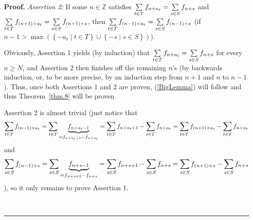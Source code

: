 \documentclass[numbers=enddot,12pt,final,onecolumn,notitlepage]{scrartcl}%
\numberwithin{exer}{section}
\theoremstyle{definition}
\newenvironment{proof}[1][Proof]{\noindent\textbf{#1.} }{\ \rule{0.5em}{0.5em}}
\let\sumnonlimits\sum
\renewcommand{\sum}{\sumnonlimits\limits}
\begin{document}
\begin{proof}
\textit{Assertion 2:} If some $n\in\mathbb{Z}$ satisfies $\sum\limits_{t\in
T}f_{n+a_{t}}=\sum\limits_{s\in S}f_{n+s}$ and $\sum\limits_{t\in T}f_{\left(
n+1\right)  +a_{t}}=\sum\limits_{s\in S}f_{\left(  n+1\right)  +s}$, then
$\sum\limits_{t\in T}f_{\left(  n-1\right)  +a_{t}}=\sum\limits_{s\in
S}f_{\left(  n-1\right)  +s}$ (if $n-1>\max\left(  \left\{  -a_{t}\mid t\in
T\right\}  \cup\left\{  -s\mid s\in S\right\}  \right)  $).

Obviously, Assertion 1 yields (by induction) that $\sum\limits_{t\in
T}f_{n+a_{t}}=\sum\limits_{s\in S}f_{n+s}$ for every $n\geq N$, and Assertion
2 then finishes off the remaining $n$'s (by backwards induction, or, to be
more precise, by an induction step from $n+1$ and $n$ to $n-1$). Thus, once
both Assertions 1 and 2 are proven, (\ref{BigLemma}) will follow and thus
Theorem~\ref{thm.8} will be proven.

Assertion 2 is almost trivial (just notice that%
\[
\sum\limits_{t\in T}f_{\left(  n-1\right)  +a_{t}}=\sum\limits_{t\in
T}\underbrace{f_{n+a_{t}-1}}_{=f_{n+a_{t}+1}-f_{n+a_{t}}}=\sum\limits_{t\in
T}f_{n+a_{t}+1}-\sum\limits_{t\in T}f_{n+a_{t}}=\sum\limits_{t\in T}f_{\left(
n+1\right)  +a_{t}}-\sum\limits_{t\in T}f_{n+a_{t}}%
\]
and%
\[
\sum\limits_{s\in S}f_{\left(  n-1\right)  +s}=\sum\limits_{s\in
S}\underbrace{f_{n+s-1}}_{=f_{n+s+1}-f_{n+s}}=\sum\limits_{s\in S}%
f_{n+s+1}-\sum\limits_{s\in S}f_{n+s}=\sum\limits_{s\in S}f_{\left(
n+1\right)  +s}-\sum\limits_{s\in S}f_{n+s}%
\]
), so it only remains to prove Assertion 1.


\end{proof}
\end{document}
